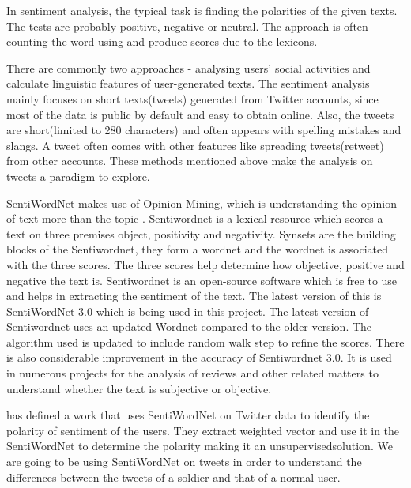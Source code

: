 In sentiment analysis, the typical task is finding the polarities of the given
texts. The tests are probably positive, negative or neutral. The approach is
often counting the word using and produce scores due to the lexicons.

There are commonly two approaches - analysing users' social activities and calculate linguistic features of user-generated texts. The sentiment analysis mainly focuses on short texts(tweets) generated from Twitter accounts, since most of the data is public by default and easy to obtain online. Also, the tweets are short(limited to 280 characters) and often appears with spelling mistakes and slangs. A tweet often comes with other features like spreading tweets(retweet) from other accounts. These methods mentioned above make the analysis on tweets a paradigm to explore.

SentiWordNet makes use of Opinion Mining, which is understanding the opinion of text more than the topic \citep{esuli2006sentiwordnet}. Sentiwordnet is a lexical resource which scores a text on three premises object, positivity and negativity. Synsets are the building blocks of the Sentiwordnet, they form a wordnet and the wordnet is associated with the three scores. The three scores help determine how objective, positive and negative the text is. Sentiwordnet is an open-source software which is free to use and helps in extracting the sentiment of the text. The latest version of this is SentiWordNet 3.0 \citep{baccianella2010sentiwordnet} which is being used in this project. The latest version of Sentiwordnet uses an updated Wordnet compared to the older version. The algorithm used is updated to include random walk step to refine the scores. There is also considerable improvement in the accuracy of Sentiwordnet 3.0. It is used in numerous projects for the analysis of reviews and other related matters to understand whether the text is subjective or objective.

\cite{montejo2012random} has defined a work that uses SentiWordNet on Twitter data to identify the polarity of sentiment of the users. They extract weighted vector and use it in the SentiWordNet to determine the polarity making it an unsupervisedsolution. We are going to be using SentiWordNet on tweets in order to understand the differences between the tweets of a soldier and that of a normal user.
